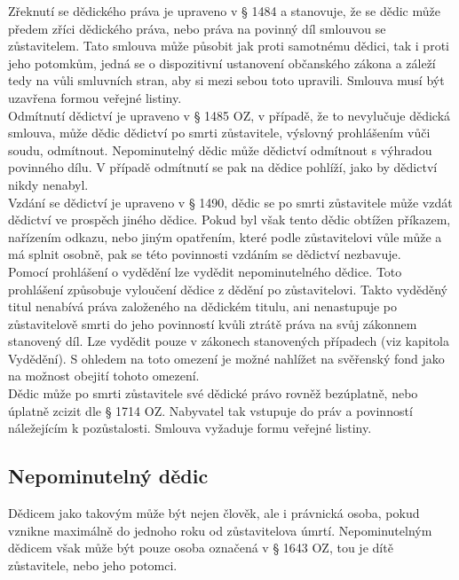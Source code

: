 \documentclass{article}
\begin{document}
Zřeknutí se dědického práva je upraveno v § 1484 a stanovuje, že se dědic může předem zříci dědického práva, nebo práva na povinný díl smlouvou se zůstavitelem. Tato smlouva může působit jak proti samotnému dědici, tak i proti jeho potomkům, jedná se o dispozitivní ustanovení občanského zákona a záleží tedy na vůli smluvních stran, aby si mezi sebou toto upravili. Smlouva musí být uzavřena formou veřejné listiny. \\

Odmítnutí dědictví je upraveno v § 1485 OZ, v případě, že to nevylučuje dědická smlouva, může dědic dědictví po smrti zůstavitele, výslovný prohlášením vůči soudu, odmítnout. Nepominutelný dědic může dědictví odmítnout s výhradou povinného dílu. V případě odmítnutí se pak na dědice pohlíží, jako by dědictví nikdy nenabyl.\\

Vzdání se dědictví je upraveno v § 1490, dědic se po smrti zůstavitele může vzdát dědictví ve prospěch jiného dědice. Pokud byl však tento dědic obtížen příkazem, nařízením odkazu, nebo jiným opatřením, které podle zůstavitelovi vůle může a má splnit osobně, pak se této povinnosti vzdáním se dědictví nezbavuje.\\

Pomocí prohlášení o vydědění lze vydědit nepominutelného dědice. Toto prohlášení způsobuje vyloučení dědice z dědění po zůstavitelovi. Takto vyděděný titul nenabívá práva založeného na dědickém titulu, ani nenastupuje po zůstavitelově smrti do jeho povinností kvůli ztrátě práva na svůj zákonnem stanovený díl. Lze vydědit pouze v zákonech stanovených případech (viz kapitola Vydědění). S ohledem na toto omezení je možné nahlížet na svěřenský fond jako na možnost obejití tohoto omezení.\\

Dědic může po smrti zůstavitele své dědické právo rovněž bezúplatně, nebo úplatně zcizit dle § 1714 OZ. Nabyvatel tak vstupuje do práv a povinností náležejícím k pozůstalosti. Smlouva vyžaduje formu veřejné listiny.\\

\subsection{Nepominutelný dědic}

Dědicem jako takovým může být nejen člověk, ale i právnická osoba, pokud vznikne maximálně do jednoho roku od zůstavitelova úmrtí. Nepominutelným dědicem však může být pouze osoba označená v § 1643 OZ, tou je dítě zůstavitele, nebo jeho potomci.\\
\end{document}
